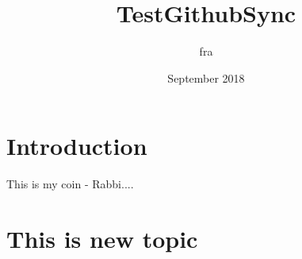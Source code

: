 \documentclass{article}
\title{TestGithubSync}
\author{fra }
\date{September 2018}
\begin{document}
\maketitle

\section{Introduction}

This is my coin - Rabbi....

\section{This is new topic}
\end{document}
